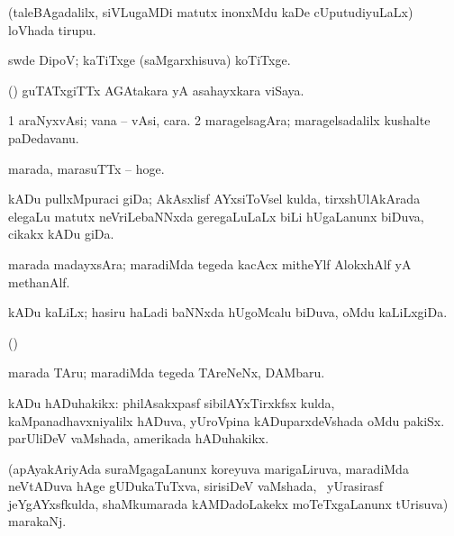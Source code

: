 {{{{{{{\bentry
{} 
\gl{\nA}
\bmng
(taleBAgadalilx, siVLugaMDi matutx inonxMdu kaDe cUputudiyuLaLx) loVhada tirupu. 
\emng
\eentry

\bentry
{} 
\gl{\nA}
\expl{}
\bmng
swde DipoV; kaTiTxge (saMgarxhisuva) koTiTxge. 
\emng

\noindent
\gl{\pagu}
\expl{}
\bmng
{} (\AmA) guTATxgiTTx AGAtakara yA asahayxkara viSaya. 
\emng
\eentry

\bentry
{} 
\gl{\nA}
\bmng
\bnum
\num{1} araNyxvAsi; vana -- vAsi, cara. 
\num{2} maragelsagAra; maragelsadalilx kushalte paDedavanu. 
\enum
\emng
\eentry

\bentry 
{} 
\gl{\nA}
\expl{}
\bmng
marada, marasuTTx -- hoge. 
\emng
\eentry

\bentry
{} 
\gl{\nA}
\expl{}
\bmng
kADu pullxMpuraci giDa; AkAsxlisf AYxsiToVsel kulda, tirxshUlAkArada elegaLu matutx neVriLebaNNxda geregaLuLaLx biLi hUgaLanunx biDuva, cikakx kADu giDa. 
\emng
\eentry

\bentry
{} 
\gl{\nA}
\expl{}
\bmng
marada madayxsAra; maradiMda tegeda kacAcx mitheYlf AlokxhAlf yA methanAlf. 
\emng
\eentry

\bentry
{} 
\gl{\nA}
\expl{}
\bmng
kADu kaLiLx; hasiru haLadi baNNxda hUgoMcalu biDuva, oMdu kaLiLxgiDa. 
\emng
\eentry

\bentry
{} 
\gl{\gu}
\expl{}
\bmng
(\ame)  
\emng
\eentry

\bentry 
{} 
\gl{\nA}
\expl{}
\bmng
marada TAru; maradiMda tegeda TAreNeNx, DAMbaru. 
\emng
\eentry

\bentry
{} 
\gl{\nA}
\expl{}
\bmng
kADu hADuhakikx: 
\banum
{} philAsakxpasf sibilAYxTirxkfsx kulda, kaMpanadhavxniyalilx hADuva, yUroVpina kADuparxdeVshada oMdu pakiSx. 
 parUliDeV vaMshada, amerikada hADuhakikx. 
\eanum
\emng
\eentry

\bentry
{} 
\gl{\nA}
\expl{}
\bmng
(apAyakAriyAda suraMgagaLanunx koreyuva marigaLiruva, maradiMda neVtADuva hAge gUDukaTuTxva, sirisiDeV vaMshada, \kanmu\ yUrasirasf jeYgAYxsfkulda, shaMkumarada kAMDadoLakekx moTeTxgaLanunx tUrisuva) marakaNj. 
\emng
\eentry

}}}}}}}
